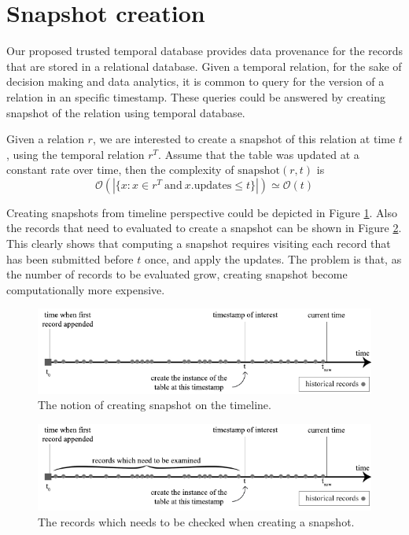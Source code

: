 	\section{Snapshot creation} \label{sec:problem_def}

		Our proposed trusted temporal database provides data provenance for the records that are stored in a relational database. Given a temporal relation, for the sake of decision making and data analytics, it is common to query for the version of a relation in an specific timestamp. These queries could be answered by creating snapshot of the relation using temporal database.


		\begin{prop}
			Given a relation $r$, we are interested to create a snapshot of this relation at time $t$, using the temporal relation $r^T$. Assume that the table was updated at a constant rate over time, then the complexity of $\mathrm{snapshot}(r, t)$ is $$\mathcal{O}(|\{x: x\in r^T\mathrm{\ and\ } x.\mathrm{updates} \leq t\}|)\simeq \mathcal{O}(t)$$ 
		\label{prop:linear_time}
		\end{prop}
			Creating snapshots from timeline perspective could be depicted in Figure \ref{fig:snapshot_notion}.
			Also the records that need to evaluated to create a snapshot can be shown in Figure \ref{fig:checked_records}. This clearly shows that computing a snapshot requires visiting each record that has been submitted before $t$ once, and apply the updates. The problem is that, as the number of records to be evaluated grow, creating snapshot become computationally more expensive.

		\begin{figure}
			\centering
			\includegraphics[width=\textwidth]{figs/snapshot_notion.pdf}
			\caption{The notion of creating snapshot on the timeline.}
			\label{fig:snapshot_notion}
		\end{figure}

		\begin{figure}
			\centering
			\includegraphics[width=\textwidth]{figs/tobechecked_records.pdf}
			\caption{The records which needs to be checked when creating a snapshot.}
			\label{fig:checked_records}
		\end{figure}

